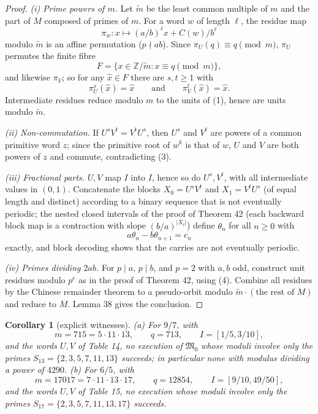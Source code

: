 \documentclass[11pt,reqno]{amsart}
\newtheorem{corollary}[theorem]{Corollary}
\theoremstyle{definition}
\theoremstyle{remark}
\begin{document}
\begin{proof}\leavevmode\label{proof:69}
\emph{(i) Prime powers of \(m\).} Let \(\tilde m\) be the least
common multiple of \(m\) and the part of \(M\) composed of primes of
\(m\). For a word \(w\) of length \(\ell\), the residue map
\[
\pi_w:x\mapsto(a/b)^\ell x+C(w)/b^\ell
\]
modulo \(\tilde m\) is an
affine permutation (\(p\nmid ab\)). Since \(\pi_U(q)\equiv q\pmod m\),
\(\pi_U\) permutes the finite fibre
\[
F=\{x\in\mathbb Z/\tilde m:x\equiv q\pmod m\},
\]
and likewise
\(\pi_V\); so for any \(\hat x\in F\) there are \(s,t\ge1\) with
\[
\pi_U^s(\hat x)=\hat x\qquad \text{and}\qquad \pi_V^t(\hat x)=\hat x.
\]
Intermediate
residues reduce modulo \(m\) to the units of (1), hence are units
modulo \(\tilde m\).

\emph{(ii) Non-commutation.} If \(U^sV^t=V^tU^s\), then
\(U^s\) and \(V^t\) are powers of a common primitive word \(z\); since
the primitive root of \(w^k\) is that of \(w\), \(U\) and \(V\) are
both powers of \(z\) and commute, contradicting (3).

\emph{(iii) Fractional
parts.} \(U,V\) map \(I\) into \(I\), hence so do \(U^s,V^t\), with all
intermediate values in \((0,1)\). Concatenate the blocks
\(X_0=U^sV^t\) and \(X_1=V^tU^s\) (of equal length and distinct)
according to a binary sequence that is not eventually periodic; the
nested closed intervals of the proof of Theorem 42 (each backward block
map is a contraction with slope \((b/a)^{|X_i|}\)) define \(\theta_n\)
for all \(n\ge0\) with
\[
a\theta_n-b\theta_{n+1}=c_n
\]
exactly, and
block decoding shows that the carries are not eventually periodic.

\emph{(iv) Primes dividing \(2ab\).} For \(p\mid a\), \(p\mid b\), and
\(p=2\) with \(a,b\) odd, construct unit residues modulo \(p^e\) as in
the proof of Theorem 42, using (4). Combine all residues by the Chinese
remainder theorem to a pseudo-orbit modulo \(\tilde m\cdot(\text{the
rest of }M)\) and reduce to \(M\). Lemma 38 gives the conclusion. \qedhere
\end{proof}

\begin{samepage}
\begin{corollary}[explicit witnesses]\leavevmode\label{thm:70}
(a) For \(9/7\), with
\[
m=715=5\cdot11\cdot13,\qquad q=713,\qquad I=[1/5,3/10],
\]
and the words
\(U,V\) of Table 14, no execution of \(\mathfrak M_0\) whose moduli
involve only the primes \(S_{13}=\{2,3,5,7,11,13\}\) succeeds; in
particular none with modulus dividing a power of \(4290\). (b) For
\(6/5\), with
\[
m=17017=7\cdot11\cdot13\cdot17,\qquad q=12854,\qquad I=[9/10,49/50],
\]
and the words \(U,V\) of Table 15, no execution
whose moduli involve only the primes
\(S_{17}=\{2,3,5,7,11,13,17\}\) succeeds.
\label{thm-end:70}
\end{corollary}
\end{samepage}
\end{document}

